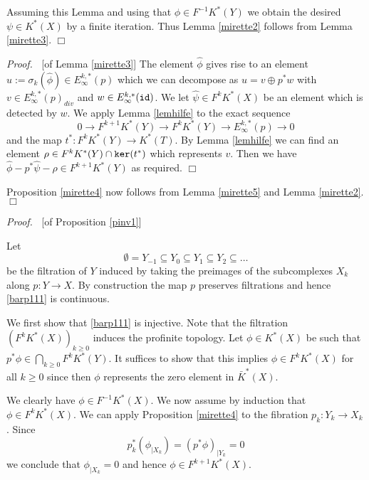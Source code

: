 \documentclass[12pt]{article}
\newcommand{\id}{{\tt id}}
\renewcommand{\ker}{{\tt ker}}
\def\hB{\hspace*{\fill}$\Box$ \newline\noindent}
\newcommand{\proof}{{\it Proof.$\:\:\:\:$}}
\begin{document}
Assuming this Lemma and using that $\phi\in F^{-1}K^{*}(Y)$ we obtain
the desired $\psi\in K^{*}(X)$ by a finite iteration. Thus Lemma \ref{mirette2}
follows from Lemma \ref{mirette3}. \hB 

\proof[of Lemma \ref{mirette3}]
The element $\hat\phi$ gives rise to an element 
$u:=\sigma_{k}(\hat \phi)\in E_{\infty}^{k,*}(p)$ which we can decompose as $u=v\oplus p^{*}w$ with $v\in E_{\infty}^{k,*}(p)_{div}$ and $w\in E^{k,*}_{\infty}(\id)$.
We let $\hat \psi\in F^{k}K^{*}(X)$ be an element which is detected by
 $w$.  
We apply Lemma \ref{lemhilfe} to the exact sequence
$$0\to F^{k+1}K^{*}(Y)\to F^{k}K^{*}(Y)\to E_{\infty}^{k,*}(p)\to 0$$
and the map $ t^{*}:F^{k}K^{*}(Y)\to K^{*}(T)$.
 By Lemma  \ref{lemhilfe}
we can find an element $\rho\in F^{k}K^{*}(Y)\cap \ker(t^{*})$ which represents
$v$.
Then we have
$\hat \phi-p^{*}\hat \psi-\rho\in F^{k+1}K^{*}(Y)$ as required.
\hB 

Proposition \ref{mirette4} now follows from Lemma \ref{mirette5} and Lemma \ref{mirette2}. \hB  

\proof[of Proposition \ref{pinv1}]

Let
$$\emptyset=Y_{-1}\subseteq Y_{0}\subseteq Y_{1}\subseteq Y_{2}\subseteq \dots$$ be the filtration of $Y$ induced by taking the preimages of the subcomplexes $X_{k}$ along $p:Y\to X$.
By construction the map $p$ preserves filtrations  and hence \eqref{barp111} is continuous.
%


 

\bigskip

We first show that \eqref{barp111} is injective. Note that the filtration 
$(F^{k}K^{*}(X))_{k\ge 0}$ induces the profinite topology.
Let $\phi\in K^{*}(X)$ be such that $p^{*}\phi\in \bigcap_{k\ge 0} F^{k}K^{*}(Y)$.
It suffices to show that this implies $\phi\in F^{k}K^{*}(X)$ for all $k\ge 0$ since then
$\phi$ represents the zero element in $\bar K^{*}(X)$.

   
We clearly have $\phi\in F^{-1}K^{*}(X)$. We now assume by induction that $\phi\in F^{k}K^{*}(X)$. We can apply Proposition \ref{mirette4} to the fibration $p_{k}:Y_{k} \to X_{k}$.
Since $$p_{k}^{*}(\phi_{|X_{k}})=(p^{*}\phi)_{|Y_{k}}=0$$ we conclude that $\phi_{|X_{k}}=0$ and hence $\phi\in F^{k+1}K^{*}(X)$.
\end{document}
